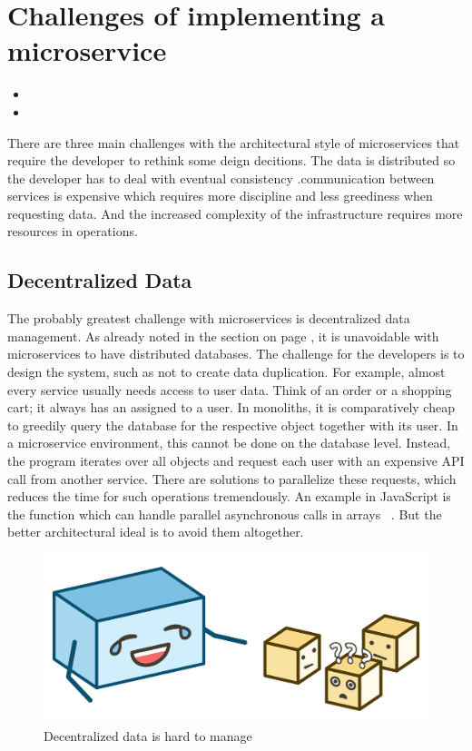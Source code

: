 \section{Challenges of implementing a microservice}

\begin{itemize}
  \item {}
  \item {}
\end{itemize}

There are three main challenges with the architectural style of microservices that require the developer to rethink some deign decitions. The data is distributed so the developer has to deal with eventual consistency .communication between services is expensive which requires more discipline and less greediness when requesting data. And the increased complexity of the infrastructure requires more resources in operations.


\subsection{Decentralized Data}
\label{sec:theory:challenges:data}

The probably greatest challenge with microservices is decentralized data management. As already noted in the section on page \pageref{sec:theory:decentralized-data}, it is unavoidable with microservices to have distributed databases. The challenge for the developers is to design the system, such as not to create data duplication. For example, almost every service usually needs access to user data. Think of an order or a shopping cart; it always has an assigned to a user. In monoliths, it is comparatively cheap to greedily query the database for the respective object together with its user. In a microservice environment, this cannot be done on the database level. Instead, the program iterates over all objects and request each user with an expensive API call from another service. There are solutions to parallelize these requests, which reduces the time for such operations tremendously. An example in JavaScript is the  function which can handle parallel asynchronous calls in arrays ~\cite{mdn.2020}. But the better architectural ideal is to avoid them altogether.

\begin{figure}[ht]
  \centering
  \includegraphics[width=0.55\linewidth]{assets/illustration-decentralized-data.png}
  \caption{Decentralized data is hard to manage}
\end{figure}

